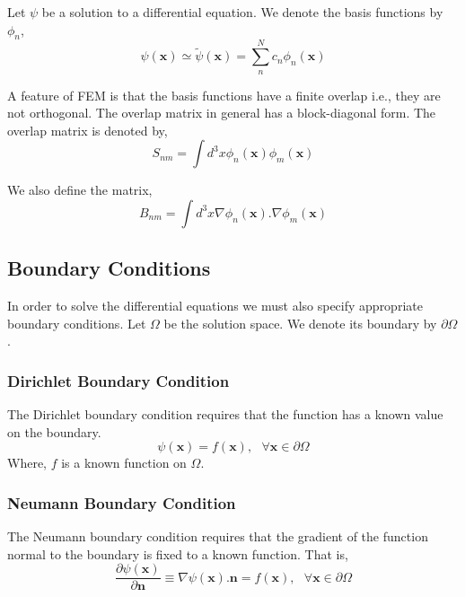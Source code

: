 \documentclass[a4paper,10pt]{report}
\begin{document}
Let $\psi$ be a solution to a differential equation. We denote the basis functions by $\phi_n$,
\begin{equation}\label{femfirst}
 \psi(\mathbf{x})\simeq\widetilde{\psi}(\mathbf{x})=\displaystyle\sum_n^N c_n\phi_n(\mathbf{x})
\end{equation}

A feature of FEM is that the basis functions have a finite overlap i.e., they are not orthogonal.
The overlap matrix in general has a block-diagonal form. The overlap matrix is denoted by,
\begin{equation}\label{overlap}
 S_{nm}=\int d^3x\phi_n(\mathbf{x})\phi_m(\mathbf{x})
\end{equation}

We also define the matrix,
\begin{equation}\label{diff_overlap}
 B_{nm}=\int d^3x\nabla\phi_n(\mathbf{x}).\nabla\phi_m(\mathbf{x})
\end{equation}

\subsection{Boundary Conditions}
In order to solve the differential equations we must also specify appropriate boundary
conditions. Let $\Omega$ be the solution space. We denote its boundary by $\partial\Omega$.

\subsubsection{Dirichlet Boundary Condition}
The Dirichlet boundary condition requires that the function has a known value on the boundary.
\begin{equation}\label{dirichlet1}
 \psi(\mathbf{x})=f(\mathbf{x}), \mbox{ }\forall\mathbf{x}\in \partial\Omega
\end{equation}
Where, $f$ is a known function on $\Omega$.

\subsubsection{Neumann Boundary Condition}
The Neumann boundary condition requires that the gradient of the function
normal to the boundary is fixed to a known function. That is,
\begin{equation}\label{neumann1}
 \frac{\partial\psi(\mathbf{x})}{\partial\mathbf{n}}\equiv\nabla\psi(\mathbf{x}).\mathbf{n} = f(\mathbf{x}), \mbox{ }\forall\mathbf{x}\in \partial\Omega
\end{equation}
\end{document}
